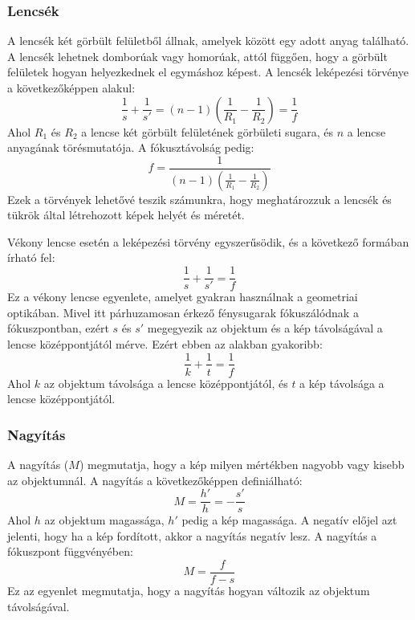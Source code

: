 \documentclass[../main.tex]{subfiles}
\begin{document}
\subsubsection*{Lencsék}
A lencsék két görbült felületből állnak, amelyek között egy adott anyag található. A lencsék lehetnek domborúak vagy homorúak, attól függően, hogy a görbült felületek hogyan helyezkednek el egymáshoz képest. A lencsék leképezési törvénye a következőképpen alakul:
\begin{equation}
    \boxed{\frac{1}{s} + \frac{1}{s'} = (n - 1) \left(\frac{1}{R_1} - \frac{1}{R_2}\right) = \frac{1}{f}}
\end{equation}
Ahol $R_1$ és $R_2$ a lencse két görbült felületének görbületi sugara, és $n$ a lencse anyagának törésmutatója. A fókusztávolság pedig:
\begin{equation}
    \boxed{f = \frac{1}{(n - 1) \left(\frac{1}{R_1} - \frac{1}{R_2}\right)}}
\end{equation}
Ezek a törvények lehetővé teszik számunkra, hogy meghatározzuk a lencsék és tükrök által létrehozott képek helyét és méretét.

Vékony lencse esetén a leképezési törvény egyszerűsödik, és a következő formában írható fel:
\begin{equation}
    \frac{1}{s} + \frac{1}{s'} = \frac{1}{f}
\end{equation}
Ez a vékony lencse egyenlete, amelyet gyakran használnak a geometriai optikában. Mivel itt párhuzamosan érkező fénysugarak fókuszálódnak a fókuszpontban, ezért $s$ és $s'$
megegyezik az objektum és a kép távolságával a lencse középpontjától mérve. Ezért ebben az alakban gyakoribb:
\begin{equation}
    \frac{1}{k} + \frac{1}{t} = \frac{1}{f}
\end{equation}
Ahol $k$ az objektum távolsága a lencse középpontjától, és $t$ a kép távolsága a lencse középpontjától.

\subsubsection*{Nagyítás}
A nagyítás ($M$) megmutatja, hogy a kép milyen mértékben nagyobb vagy kisebb az objektumnál. A nagyítás a következőképpen definiálható:
\begin{equation}
    M = \frac{h'}{h} = - \frac{s'}{s}
\end{equation}
Ahol $h$ az objektum magassága, $h'$ pedig a kép magassága. A negatív előjel azt jelenti, hogy ha a kép fordított, akkor a nagyítás negatív lesz. A nagyítás a fókuszpont függvényében:
\begin{equation}
    M = \frac{f}{f - s}
\end{equation}
Ez az egyenlet megmutatja, hogy a nagyítás hogyan változik az objektum távolságával.
\end{document}
